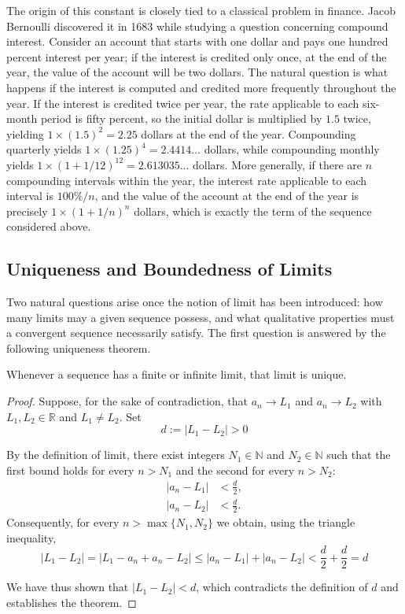 The origin of this constant is closely tied to a classical problem in finance. Jacob Bernoulli discovered it in
1683 while studying a question concerning compound interest. Consider an account that starts with one dollar and
pays one hundred percent interest per year; if the interest is credited only once, at the end of the year, the
value of the account will be two dollars. The natural question is what happens if the interest is computed and
credited more frequently throughout the year. If the interest is credited twice per year, the rate applicable to
each six-month period is fifty percent, so the initial dollar is multiplied by $1.5$ twice, yielding $1 \times (1.5)^2 = 2.25$ dollars at the end of the year. Compounding quarterly yields $1 \times (1.25)^4 = 2.4414\ldots$ dollars, while compounding monthly yields $1 \times (1 + 1/12)^{12} = 2.613035\ldots$ dollars. More generally,
if there are $n$ compounding intervals within the year, the interest rate applicable to each interval is
$100\%/n$, and the value of the account at the end of the year is precisely $1 \times (1 + 1/n)^n$ dollars,
which is exactly the term of the sequence considered above.

\subsection{Uniqueness and Boundedness of Limits}

Two natural questions arise once the notion of limit has been introduced: how many limits may a given sequence
possess, and what qualitative properties must a convergent sequence necessarily satisfy. The first question is
answered by the following uniqueness theorem.

\begin{theorem}
Whenever a sequence has a finite or infinite limit, that limit is unique.
\end{theorem}

\begin{proof}
Suppose, for the sake of contradiction, that $a_n \to L_1$ and $a_n \to L_2$ with $L_1, L_2 \in \mathbb{R}$ and
$L_1 \neq L_2$. Set
\[
d := |L_1 - L_2| > 0
\]

By the definition of limit, there exist integers $N_1 \in \mathbb{N}$ and $N_2 \in \mathbb{N}$ such that the first bound holds for every $n > N_1$ and the second for every $n > N_2$:
\[
\begin{aligned}
|a_n - L_1| &< \frac{d}{2}, \\
|a_n - L_2| &< \frac{d}{2}.
\end{aligned}
\]
Consequently, for every $n > \max\{N_1, N_2\}$ we obtain, using the triangle inequality,
\[
|L_1 - L_2| = |L_1 - a_n + a_n - L_2| \leq |a_n - L_1| + |a_n - L_2| < \frac{d}{2} + \frac{d}{2} = d
\]

We have thus shown that $|L_1 - L_2| < d$, which contradicts the definition of $d$ and establishes the theorem.
\end{proof}

